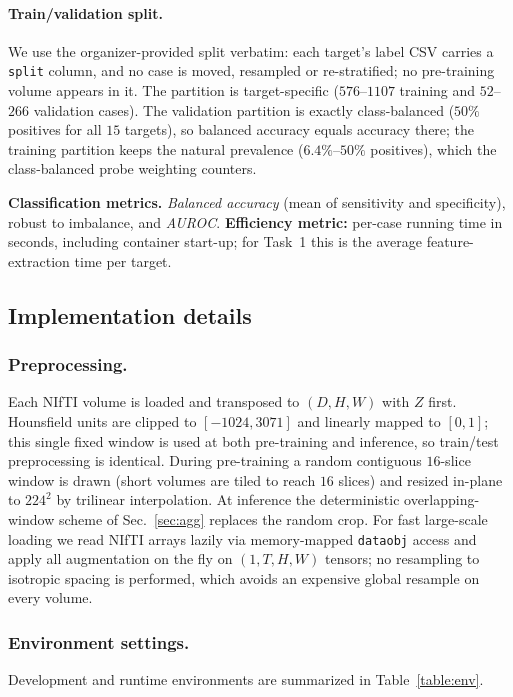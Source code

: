 \documentclass[runningheads]{llncs}
\begin{document}
\paragraph{Train/validation split.}
We use the organizer-provided split verbatim: each target's label CSV carries a
\texttt{split} column, and no case is moved, resampled or re-stratified; no
pre-training volume appears in it. The partition is target-specific ($576$--$1107$
training and $52$--$266$ validation cases). The validation partition is exactly
class-balanced ($50\%$ positives for all $15$ targets), so balanced accuracy
equals accuracy there; the training partition keeps the natural prevalence
($6.4\%$--$50\%$ positives), which the class-balanced probe weighting counters.

\noindent\textbf{Classification metrics.}
\emph{Balanced accuracy} (mean of sensitivity and specificity), robust to
imbalance, and \emph{AUROC}. \textbf{Efficiency metric:} per-case running time
in seconds, including container start-up; for Task~1 this is the average
feature-extraction time per target.

\subsection{Implementation details}

\subsubsection{Preprocessing.}
\label{sec:preproc}
Each NIfTI volume is loaded and transposed to $(D,H,W)$ with $Z$ first. Hounsfield
units are clipped to $[-1024, 3071]$ and linearly mapped to $[0,1]$; this single
fixed window is used at both pre-training and inference, so train/test
preprocessing is identical. During pre-training a random contiguous $16$-slice
window is drawn (short volumes are tiled to reach $16$ slices) and resized
in-plane to $224^2$ by trilinear interpolation. At inference the deterministic
overlapping-window scheme of Sec.~\ref{sec:agg} replaces the random crop. For
fast large-scale loading we read NIfTI arrays lazily via memory-mapped
\texttt{dataobj} access and apply all augmentation on the fly on $(1,T,H,W)$
tensors; no resampling to isotropic spacing is performed, which avoids an
expensive global resample on every volume.

\subsubsection{Environment settings.}
Development and runtime environments are summarized in Table~\ref{table:env}.
\end{document}
